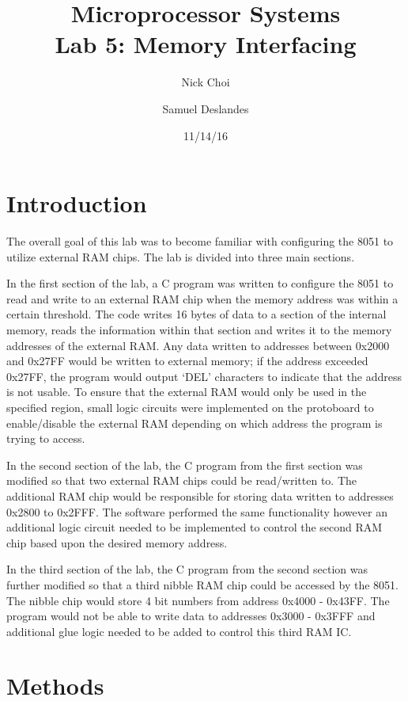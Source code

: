 \documentclass[12pt]{article}
\begin{document}
\title{Microprocessor Systems\\ Lab 5: Memory Interfacing }
\author{Nick Choi \and Samuel Deslandes}
\date{11/14/16}
\maketitle
\pagebreak
\section{Introduction}
The overall goal of this lab was to become familiar with configuring the 8051 to utilize external RAM chips. The lab is divided into three main sections. 

In the first section of the lab, a C program was written to configure the 8051 to read and write to an external RAM chip when the memory address was within a certain threshold. The code writes 16 bytes of data to a section of the internal memory, reads the information within that section and writes it to the memory addresses of the external RAM. Any data written to addresses between 0x2000 and 0x27FF would be written to external memory; if the address exceeded 0x27FF, the program would output ‘DEL’ characters to indicate that the address is not usable. To ensure that the external RAM would only be used in the specified region, small logic circuits were implemented on the protoboard to enable/disable the external RAM depending on which address the program is trying to access. 

In the second section of the lab, the C program from the first section was modified so that two external RAM chips could be read/written to. The additional RAM chip would be responsible for storing data written to addresses 0x2800 to 0x2FFF. The software performed the same functionality however an additional logic circuit needed to be implemented to control the second RAM chip based upon the desired memory address. 

In the third section of the lab, the C program from the second section was further modified so that a third nibble RAM chip could be accessed by the 8051. The nibble chip would store 4 bit numbers from address 0x4000 - 0x43FF. The program would not be able to write data to addresses 0x3000 - 0x3FFF and additional glue logic needed to be added to control this third RAM IC. 


\section{Methods}
\end{document}
